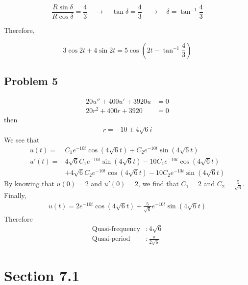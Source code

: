 \documentclass[12pt]{article}
\begin{document}
\begin{equation*}
\frac{R \sin \delta}{R \cos \delta}=\frac{4}{3} \quad \rightarrow \quad \tan \delta=\frac{4}{3} \quad \rightarrow \quad \delta=\tan ^{-1} \frac{4}{3}
\end{equation*}

Therefore,

\begin{equation*}
3 \cos 2 t+4 \sin 2 t=5 \cos \left(2 t-\tan ^{-1} \frac{4}{3}\right)
\end{equation*}

\subsection*{Problem 5}
\label{sec:org9b074af}
\begin{align*}
  20 u'' + 400 u' + 3920u &= 0\\
  20r^2 + 400r + 3920 &= 0
\end{align*}
then
\begin{align*}
  r = -10 \pm 4 \sqrt{6} i
\end{align*}
We see that
\begin{align*}
        u(t) =  & C_1 e^{-10t}\cos(4\sqrt{6}t) + C_2 e^{-10t}\sin(4\sqrt{6}t)                   \\
        u'(t) = & 4\sqrt{6}C_1e^{-10t}\sin(4\sqrt{6}t) - 10 C_1 e^{-10t} \cos(4\sqrt{6}t)       \\
                & + 4\sqrt{6} C_2 e^{-10t} \cos(4\sqrt{6}t) - 10 C_2 e^{-10t} \sin (4\sqrt{6}t)
\end{align*}
By knowing that \(u(0)=2\) and \(u'(0)=2\), we find that \(C_1=2\) and
\(C_2=\frac{5}{\sqrt{6}}\). Finally,
\begin{align*}
  u(t) = 2 e^{-10t} \cos(4\sqrt{6}t) + \frac{5}{\sqrt{6}} e^{-10t} \sin(4\sqrt{6}t)
\end{align*}
Therefore
\begin{align*}
  \text{Quasi-frequency} &: 4\sqrt{6}\\
  \text{Quasi-period}    &: \frac{\pi}{2\sqrt{6}}
\end{align*}
\section*{Section 7.1}
\label{sec:org8e96b4a}
\end{document}
